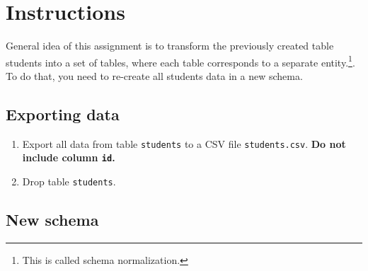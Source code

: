 \documentclass[12pt]{article}
\newcommand{\code}[1]{\texttt{#1}}
\begin{document}
\section*{Instructions}

General idea of this assignment is to transform the previously created table students into a set of tables, where each table corresponds to a separate entity.\footnote{This is called schema normalization.}. To do that, you need to re-create all students data in a new schema.

\subsection*{Exporting data}

\begin{enumerate}
\item Export all data from table \code{students} to a CSV file \code{students.csv}. \textbf{Do not include column \code{id}.}
\item Drop table \code{students}.
\end{enumerate}

\subsection*{New schema}
\end{document}
